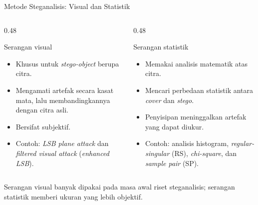 \documentclass[aspectratio=169,11pt]{beamer}
\begin{document}
\begin{frame}{Metode Steganalisis: Visual dan Statistik}
    \begin{columns}[T,onlytextwidth]
        \begin{column}{0.48\textwidth}
            \begin{block}{Serangan visual}
                \footnotesize
                \begin{itemize}
                    \item Khusus untuk \textit{stego-object} berupa citra.
                    \item Mengamati artefak secara kasat mata, lalu
                          membandingkannya dengan citra asli.
                    \item Bersifat subjektif.
                    \item Contoh: \textit{LSB plane attack} dan
                          \textit{filtered visual attack}
                          (\textit{enhanced LSB}).
                \end{itemize}
            \end{block}
        \end{column}
        \begin{column}{0.48\textwidth}
            \begin{block}{Serangan statistik}
                \footnotesize
                \begin{itemize}
                    \item Memakai analisis matematik atas citra.
                    \item Mencari perbedaan statistik antara \textit{cover}
                          dan \textit{stego}.
                    \item Penyisipan meninggalkan artefak yang dapat diukur.
                    \item Contoh: analisis histogram,
                          \textit{regular-singular} (RS),
                          \textit{chi-square}, dan
                          \textit{sample pair} (SP).
                \end{itemize}
            \end{block}
        \end{column}
    \end{columns}
    \vspace{0.1cm}
    \footnotesize
    Serangan visual banyak dipakai pada masa awal riset steganalisis;
    serangan statistik memberi ukuran yang lebih objektif.
\end{frame}
\end{document}
